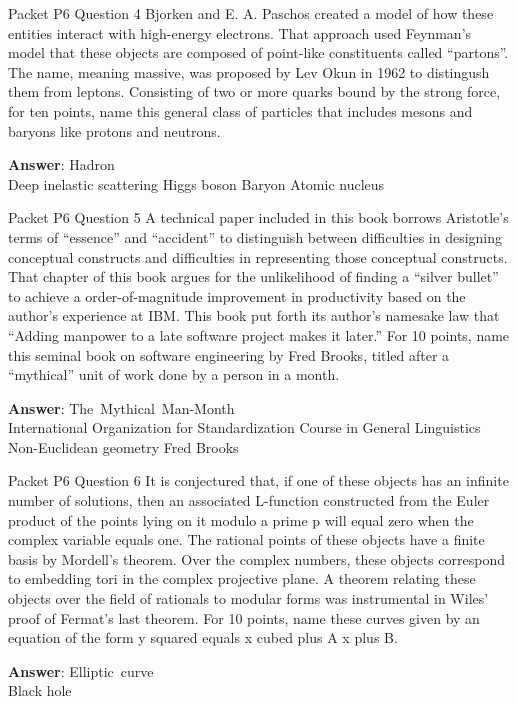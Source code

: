 \begin{frame}{Packet P6 Question 4}
Bjorken and E. A. Paschos   created a model   of how these entities interact with high-energy electrons.  That approach used Feynman's model that these objects are composed of point-like constituents called ``partons''.  The name, meaning massive, was proposed by Lev Okun in 1962 to distingush them from leptons.  Consisting of two or more quarks bound by the strong force, for ten points, name this general class of particles that includes mesons and baryons like protons and neutrons.    

\textbf{Answer}: Hadron\\
 Deep inelastic scattering
 Higgs boson
 Baryon
 Atomic nucleus
\end{frame}

\begin{frame}{Packet P6 Question 5}
A technical paper included   in this book borrows Aristotle’s terms of “essence” and “accident” to distinguish between difficulties in designing conceptual constructs and difficulties in representing those conceptual constructs. That chapter of this book argues for the unlikelihood of   finding a “silver bullet” to achieve a order-of-magnitude improvement in productivity based on the author's experience   at IBM. This book put forth its author’s namesake law that “Adding manpower to a late software project makes it later.” For 10 points, name this seminal book on software engineering by Fred Brooks, titled   after a “mythical” unit of work done by a person in a month.    

\textbf{Answer}: The\ Mythical\ Man-Month\\
 International Organization for Standardization
 Course in General Linguistics
 Non-Euclidean geometry
 Fred Brooks
\end{frame}

\begin{frame}{Packet P6 Question 6}
It is conjectured that, if one of these objects has an infinite   number of solutions, then an associated L-function constructed from the Euler product of the points lying on it modulo a prime p will equal zero when the complex variable equals one. The rational points of these objects have a finite basis by Mordell's theorem.   Over the complex numbers, these objects correspond to embedding tori in the complex projective plane. A theorem relating   these objects over the field of rationals to modular forms was instrumental   in Wiles' proof of Fermat's last theorem. For 10 points, name these curves given by an equation of the form y squared equals   x cubed plus A x plus B.

\textbf{Answer}: Elliptic\ curve\\
 Black hole
\end{frame}

